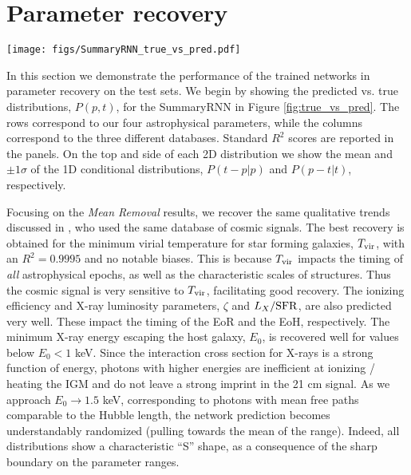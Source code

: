 \documentclass[fleqn,usenatbib]{mnras}
\begin{document}
\section{Parameter recovery} \label{sec:parameter_recovery}

\begin{figure*}%
    \centering
    \texttt{[image: figs/SummaryRNN\_true\_vs\_pred.pdf]}
    \caption{Histograms of True vs. Predicted, $P(p,t)$, for our SummaryRNN architecture and all databases. From left to right, columns represent: \textit{Mean Removal}, \textit{+SKA noise}, \textit{+Horizon Cut} datasets. Rows correspond to our four astrophysical parameters (defined in the text). Each panel is bordered by the mean and $\pm 1 \sigma$ of the 1D conditional distributions, $P(t-p|p)$ and $P(p-t|t)$. $R^2$ coefficients are marked in upper-left corners. Some labels are omitted to avoid overcrowding; see the top-left panel for the relevant labels.}
    \label{fig:true_vs_pred}
\end{figure*}

In this section we demonstrate the performance of the trained networks in parameter recovery on the test sets.  We begin by showing the predicted vs. true distributions, $P(p,t)$, for the SummaryRNN in Figure \ref{fig:true_vs_pred}.  The rows correspond to our four astrophysical parameters, while the columns correspond to the three different databases.  Standard $R^2$ scores are reported in the panels. On the top and side of each 2D distribution we show the mean and $\pm1\sigma$ of the 1D conditional distributions, $P(t - p | p)$ and $P(p - t | t)$, respectively.

Focusing on the {\it Mean Removal} results, we recover the same qualitative trends discussed in \citet{gillet19}, who used the same database of cosmic signals.  The best recovery is obtained for the minimum virial temperature for star forming galaxies, $T_{\rm vir}$, with an $R^2 = 0.9995$ and no notable biases. This is because $T_{\rm vir}$ impacts the timing of {\it all} astrophysical epochs, as well as the characteristic scales of structures.  Thus the cosmic signal is very sensitive to $T_{\rm vir}$, facilitating good recovery.  The ionizing efficiency and X-ray luminosity parameters, $\zeta$ and $L_{X}/{\rm SFR}$, are also predicted very well.  These impact the timing of the EoR and the EoH, respectively.  The minimum X-ray energy escaping the host galaxy, $E_0$, is recovered well for values below $E_0 < 1$ keV.  Since the interaction cross section for X-rays is a strong function of energy, photons with higher energies are inefficient at ionizing / heating the IGM and do not leave a strong imprint in the 21 cm signal.  As we approach $E_0 \rightarrow 1.5$ keV, corresponding to photons with mean free paths comparable to the Hubble length,  the network prediction becomes understandably randomized (pulling towards the mean of the range).  Indeed, all distributions show a characteristic \enquote{S} shape, as a consequence of the sharp boundary on the parameter ranges.
\end{document}

